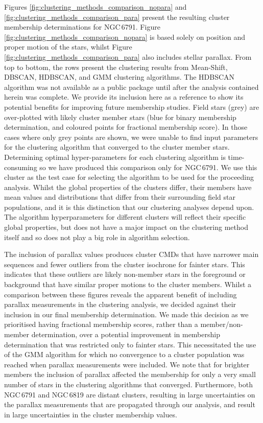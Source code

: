 Figures \ref{fig:clustering_methods_comparison_nopara} and \ref{fig:clustering_methods_comparison_para} present the resulting cluster membership determinations for NGC\,6791. Figure \ref{fig:clustering_methods_comparison_nopara} is based solely on position and proper motion of the stars, whilst Figure \ref{fig:clustering_methods_comparison_para} also includes stellar parallax. From top to bottom, the rows present the clustering results from Mean-Shift, DBSCAN, HDBSCAN, and GMM clustering algorithms. The HDBSCAN algorithm was not available as a public package until after the analysis contained herein was complete. We provide its inclusion here as a reference to show its potential benefits for improving future membership studies. Field stars (grey) are over-plotted with likely cluster member stars (blue for binary membership determination, and coloured points for fractional membership score). In those cases where only grey points are shown, we were unable to find input parameters for the clustering algorithm that converged to the cluster member stars. Determining optimal hyper-parameters for each clustering algorithm is time-consuming so we have produced this comparison only for NGC\,6791. We use this cluster as the test case for selecting the algorithm to be used for the proceeding analysis. Whilst the global properties of the clusters differ, their members have mean values and distributions that differ from their surrounding field star populations, and it is this distinction that our clustering analyses depend upon. The algorithm hyperparameters for different clusters will reflect their specific global properties, but does not have a major impact on the clustering method itself and so does not play a big role in algorithm selection.

The inclusion of parallax values produces cluster CMDs that have narrower main sequences and fewer outliers from the cluster isochrone for fainter stars. This indicates that these outliers are likely non-member stars in the foreground or background that have similar proper motions to the cluster members. Whilst a comparison between these figures reveals the apparent benefit of including parallax measurements in the clustering analysis, we decided against their inclusion in our final membership determination. We made this decision as we prioritised having fractional membership scores, rather than a member/non-member determination, over a potential improvement in membership determination that was restricted only to fainter stars. This necessitated the use of the GMM algorithm for which no convergence to a cluster population was reached when parallax measurements were included. We note that for brighter members the inclusion of parallax affected the membership for only a very small number of stars in the clustering algorithms that converged. Furthermore, both NGC\,6791 and NGC\,6819 are distant clusters, resulting in large uncertainties on the parallax measurements that are propagated through our analysis, and result in large uncertainties in the cluster membership values.

